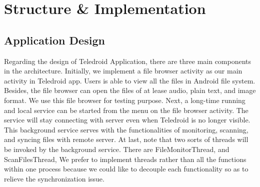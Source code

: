 \section{Structure \& Implementation}
\label{sec:Implementation}
\subsection{Application Design}
		Regarding the design of Teledroid Application, there are three main components in the architecture. Initially, we implement a file browser activity as our main activity in Teledroid app. Users is able to view all the files in Android file system. Besides, the file browser can open the files of at lease audio, plain text, and image format. We use this file browser for testing purpose. Next, a long-time running and local service can be started from the menu on the file browser activity. The service will stay connecting with server even when Teledroid is no longer visible. This background service serves with the functionalities of monitoring, scanning, and syncing files with remote server. At last, note that two sorts of threads will be invoked by the background service. There are FileMonitorThread, and ScanFilesThread, We prefer to implement threads rather than all the functions within one process because we could like to decouple each functionality so as to relieve the synchronization issue.

